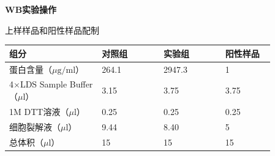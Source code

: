 \documentclass[UTF8,10pt,a4paper,fontset=fandol]{ctexart}
\newcommand{\fieldvalue}[1]{#1}
\newcommand{\handwritten}[1]{#1}
\begin{document}
\begin{center}
\textbf{WB实验操作}
\end{center}

\begin{center}
上样样品和阳性样品配制
\end{center}

\begin{tabular}{|p{0.30\linewidth}|p{0.20\linewidth}|p{0.20\linewidth}|p{0.16\linewidth}|}
\hline
组分 & 对照组 & 实验组 & 阳性样品
\\ \hline
蛋白含量（\(\mu\mathrm{g}/\mathrm{ml}\)） &
\fieldvalue{\handwritten{264.1}}
&
\fieldvalue{\handwritten{2947.3}}
&
\fieldvalue{\handwritten{1}}
\\ \hline
4$\times$LDS Sample Buffer（\(\mu\mathrm{l}\)） &
\fieldvalue{\handwritten{3.15}}
&
\fieldvalue{\handwritten{3.75}}
&
\fieldvalue{\handwritten{3.75}}
\\ \hline
1M DTT溶液（\(\mu\mathrm{l}\)） &
\fieldvalue{\handwritten{0.25}}
&
\fieldvalue{\handwritten{0.25}}
&
\fieldvalue{\handwritten{0.25}}
\\ \hline
细胞裂解液（\(\mu\mathrm{l}\)） &
\fieldvalue{\handwritten{9.44}}
&
\fieldvalue{\handwritten{8.40}}
&
\fieldvalue{\handwritten{5}}
\\ \hline
总体积（\(\mu\mathrm{l}\)） &
\fieldvalue{\handwritten{15}}
&
\fieldvalue{\handwritten{15}}
&
\fieldvalue{\handwritten{15}}
\\ \hline
\end{tabular}
\end{document}
